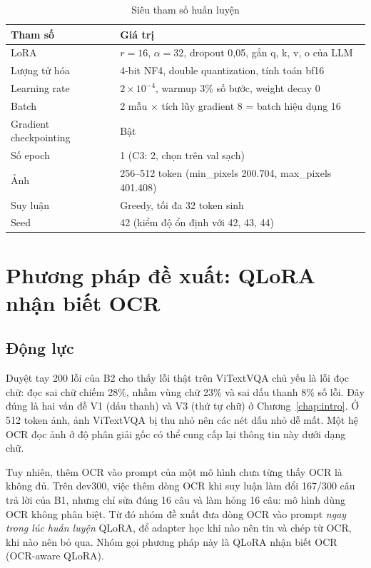 \begin{table}[htbp]
\caption{Siêu tham số huấn luyện}
\label{tab:met-hparams}
\centering
\small
\begin{tabular}{p{}p{}}
\toprule
\textbf{Tham số} & \textbf{Giá trị} \\
\midrule
LoRA & $r = 16$, $\alpha = 32$, dropout 0,05, gắn q, k, v, o của LLM \\
Lượng tử hóa & 4-bit NF4, double quantization, tính toán bf16 \\
Learning rate & $2\times10^{-4}$, warmup 3\% số bước, weight decay 0 \\
Batch & 2 mẫu $\times$ tích lũy gradient 8 = batch hiệu dụng 16 \\
Gradient checkpointing & Bật \\
Số epoch & 1 (C3: 2, chọn trên val sạch) \\
Ảnh & 256--512 token (min\_pixels 200.704, max\_pixels 401.408) \\
Suy luận & Greedy, tối đa 32 token sinh \\
Seed & 42 (kiểm độ ổn định với 42, 43, 44) \\
\bottomrule
\end{tabular}
\end{table}

\section{Phương pháp đề xuất: QLoRA nhận biết OCR}
\label{sec:met-ocr}

\subsection{Động lực}

Duyệt tay 200 lỗi của B2 cho thấy lỗi thật trên ViTextVQA chủ yếu là lỗi đọc
chữ: đọc sai chữ chiếm 28\%, nhầm vùng chữ 23\% và sai dấu thanh 8\% số lỗi. Đây
đúng là hai vấn đề V1 (dấu thanh) và V3 (thứ tự chữ) ở Chương~\ref{chap:intro}.
Ở 512 token ảnh, ảnh ViTextVQA bị thu nhỏ nên các nét dấu nhỏ dễ mất. Một hệ OCR
đọc ảnh ở độ phân giải gốc có thể cung cấp lại thông tin này dưới dạng chữ.

Tuy nhiên, thêm OCR vào prompt của một mô hình chưa từng thấy OCR là không đủ.
Trên dev300, việc thêm dòng OCR khi suy luận làm đổi 167/300 câu trả lời của B1,
nhưng chỉ sửa đúng 16 câu và làm hỏng 16 câu: mô hình dùng OCR không phân biệt.
Từ đó nhóm đề xuất đưa dòng OCR vào prompt \emph{ngay trong lúc huấn luyện}
QLoRA, để adapter học khi nào nên tin và chép từ OCR, khi nào nên bỏ qua. Nhóm
gọi phương pháp này là QLoRA nhận biết OCR (OCR-aware QLoRA).

